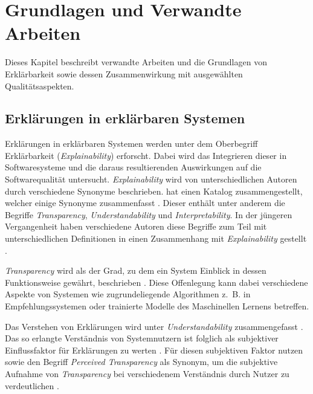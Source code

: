 \chapter{Grundlagen und Verwandte Arbeiten}

Dieses Kapitel beschreibt verwandte Arbeiten und die Grundlagen von Erklärbarkeit sowie dessen Zusammenwirkung mit ausgewählten Qualitätsaspekten.

\section{Erklärungen in erklärbaren Systemen}
\label{02_basics:explainable_system}

Erklärungen in erklärbaren Systemen werden unter dem Oberbegriff Erklärbarkeit (\textit{Explainability}) erforscht. Dabei wird das Integrieren dieser in Softwaresysteme und die daraus resultierenden Auswirkungen auf die Softwarequalität untersucht. \textit{Explainability} wird von unterschiedlichen Autoren durch verschiedene Synonyme beschrieben. \citeauthor{brennen_what_2020} hat einen Katalog zusammengestellt, welcher einige Synonyme zusammenfasst \cite{brennen_what_2020}. Dieser enthält unter anderem die Begriffe
\textit{Transparency}, \textit{Understandability} und \textit{Interpretability}. In der jüngeren Vergangenheit haben verschiedene Autoren diese Begriffe zum Teil mit unterschiedlichen Definitionen in einen Zusammenhang mit \textit{Explainability} gestellt \cite{chazette_end-users_nodate,chazette_knowledge_nodate,kohl_explainability_2019,wang_integration_2020}.

\textit{Transparency} wird als der Grad, zu dem ein System Einblick in dessen Funktionsweise gewährt, beschrieben \cite{chazette_end-users_nodate}. Diese Offenlegung kann dabei verschiedene Aspekte von Systemen wie zugrundeliegende Algorithmen z.~B. in Empfehlungssystemen \cite{balog_measuring_2020} oder trainierte Modelle des Maschinellen Lernens \cite{sovrano_modelling_2020} betreffen.

Das Verstehen von Erklärungen wird unter \textit{Understandability} zusammengefasst \cite{do2010software}. Das so erlangte Verständnis von Systemnutzern ist folglich als subjektiver Einflussfaktor für Erklärungen zu werten \cite{chazette_end-users_nodate}. Für diesen subjektiven Faktor nutzen \citeauthor{wang_integration_2020} sowie \citeauthor{balog_measuring_2020} den Begriff \textit{Perceived Transparency} als Synonym, um die subjektive Aufnahme von \textit{Transparency} bei verschiedenem Verständnis durch Nutzer zu verdeutlichen \cite{wang_integration_2020, balog_measuring_2020}.


